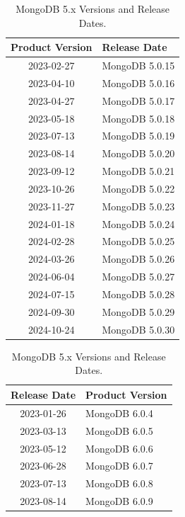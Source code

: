 \documentclass[../main.tex]{subfiles}
\begin{document}
\begin{table}[H]
\centering
\begin{minipage}{0.45\textwidth}
\centering
\begin{tabular}{|c|l|}
\hline
\textbf{Product Version} & \textbf{Release Date} \\ \hline
    2023-02-27 & MongoDB 5.0.15 \\ \hline
    2023-04-10 & MongoDB 5.0.16 \\ \hline
    2023-04-27 & MongoDB 5.0.17 \\ \hline
    2023-05-18 & MongoDB 5.0.18 \\ \hline
    2023-07-13 & MongoDB 5.0.19 \\ \hline
    2023-08-14 & MongoDB 5.0.20 \\ \hline
    2023-09-12 & MongoDB 5.0.21 \\ \hline
    2023-10-26 & MongoDB 5.0.22 \\ \hline
    2023-11-27 & MongoDB 5.0.23 \\ \hline
    2024-01-18 & MongoDB 5.0.24 \\ \hline
    2024-02-28 & MongoDB 5.0.25 \\ \hline
    2024-03-26 & MongoDB 5.0.26 \\ \hline
    2024-06-04 & MongoDB 5.0.27 \\ \hline
    2024-07-15 & MongoDB 5.0.28 \\ \hline
    2024-09-30 & MongoDB 5.0.29 \\ \hline
    2024-10-24 & MongoDB 5.0.30 \\ \hline
\end{tabular}
\caption{MongoDB 5.x Versions and Release Dates. \protect\footnotemark}
\end{minipage}
\hspace{1cm} %
\begin{minipage}{0.45\textwidth}
\centering
\begin{tabular}{|c|l|}
\hline
\textbf{Release Date} & \textbf{Product Version} \\ \hline
    2023-01-26 & MongoDB 6.0.4 \\ \hline
    2023-03-13 & MongoDB 6.0.5 \\ \hline
    2023-05-12 & MongoDB 6.0.6 \\ \hline
    2023-06-28 & MongoDB 6.0.7 \\ \hline
    2023-07-13 & MongoDB 6.0.8 \\ \hline
    2023-08-14 & MongoDB 6.0.9 \\ \hline

\end{tabular}
\end{minipage}
\end{table}
\end{document}
